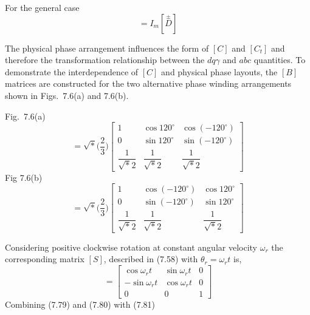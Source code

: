\documentclass[a4paper,numbers=noenddot,12pt]{scrbook}
\begin{document}
        For the general case
        \begin{equation}
            [i_{abc}] = I_m[\overset{\pm}{D}]
            \label{eq:Eq7.78}
        \end{equation}

        The physical phase arrangement influences the form of $[C]$ and $[C_t]$ and therefore the transformation relationship between the $d q \gamma$ and $abc$ quantities. To demonstrate the interdependence of $[C]$ and physical phase layouts, the $[B]$ matrices are constructed for the two alternative phase winding arrangements shown in Figs.\ 7.6(a) and 7.6(b).

        Fig.\ 7.6(a)
        \begin{equation}
            [\overset{+}{B}] = \sqrt*{\Big(\dfrac{2}{3} \Big)}
            \begin{bmatrix}
                1 & \cos 120^{\circ} & \cos (-120^{\circ}) \\
                0 & \sin 120^{\circ} & \sin (-120^{\circ}) \\
                \dfrac{1}{\sqrt*{2}} & \dfrac{1}{\sqrt*{2}} & \dfrac{1}{\sqrt*{2}}
            \end{bmatrix}
            \label{eq:Eq7.79}
        \end{equation}
        Fig 7.6(b)
        \begin{equation}
            [\overset{-}{B}] = \sqrt*{\Big(\dfrac{2}{3} \Big)}
            \begin{bmatrix}
                1 & \cos (- 120^{\circ}) & \cos 120^{\circ} \\
                0 & \sin (- 120^{\circ}) & \sin 120^{\circ} \\
                \dfrac{1}{\sqrt*{2}} & \dfrac{1}{\sqrt*{2}} & \dfrac{1}{\sqrt*{2}}
            \end{bmatrix}
            \label{eq:Eq7.80}
        \end{equation}

        Considering positive clockwise rotation at constant angular velocity $\omega_r$ the corresponding matrix $[S]$, described in (7.58) with  $\theta_r = \omega_r t$ is,
        \begin{equation}
            [S] = 
            \begin{bmatrix}
                \cos \omega_r t & \sin \omega_r t & 0 \\
                - \sin \omega_r t  & \cos \omega_r t & 0 \\
                0 & 0 & 1
            \end{bmatrix}
            \label{eq:Eq7.81}
        \end{equation}
        Combining (7.79) and (7.80) with (7.81)
\end{document}

